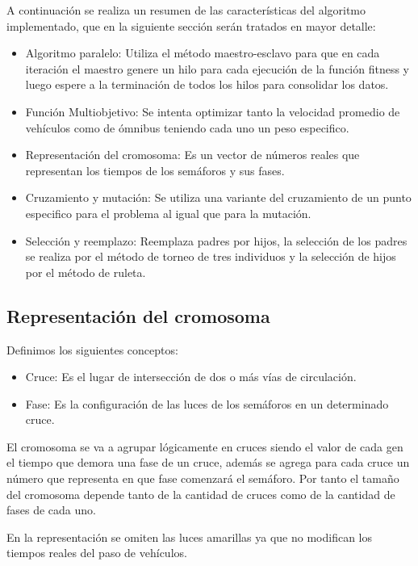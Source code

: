 A continuación se realiza un resumen de las características del algoritmo implementado, que en la siguiente sección serán tratados en mayor detalle:
\begin{itemize}

\item Algoritmo paralelo: Utiliza el método maestro-esclavo para que en cada iteración el maestro genere un hilo para cada ejecución  de la función fitness y luego espere a la terminación de todos los hilos para consolidar los datos. 
\item Función Multiobjetivo: Se intenta optimizar tanto la velocidad promedio de vehículos como de ómnibus teniendo cada uno un peso especifico.
\item Representación del cromosoma: Es un vector de números reales que representan los tiempos de los semáforos y sus fases.
\item Cruzamiento y mutación: Se utiliza una variante del cruzamiento de un punto especifico para el problema al igual que para la mutación.
\item Selección y reemplazo: Reemplaza padres por hijos, la selección de los padres se realiza por el método de torneo de tres individuos y la selección de hijos por el método de ruleta.

\end{itemize}






 

\subsection{Representación del cromosoma}

Definimos los siguientes conceptos:
\begin{itemize}
	\item Cruce: Es el lugar de intersección de dos o más vías de circulación.
	\item Fase: Es la configuración de las luces de los semáforos en un determinado cruce.
\end{itemize}


El  cromosoma  se  va  a  agrupar  lógicamente  en  cruces siendo el valor de cada gen el tiempo que demora una
fase de un cruce, además se agrega para cada cruce un número que representa en que fase comenzará el semáforo. 
Por tanto el tamaño del cromosoma depende tanto de la cantidad de cruces como de la cantidad de fases de cada uno.

En la representación se omiten las luces amarillas ya que no modifican los tiempos reales del paso de vehículos.
 

